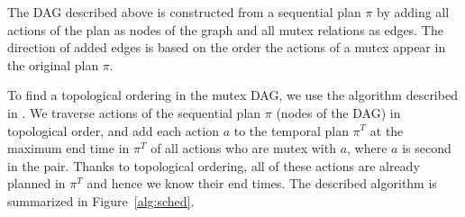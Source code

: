 The DAG described above is constructed
from a sequential plan $\pi$ by adding
all actions of the plan as nodes of the graph
and all mutex relations as edges.
The direction of added edges is based on the order
the actions of a mutex appear in the original plan $\pi$.

To find a topological ordering in the mutex DAG,
we use the algorithm described in \citet{Kahn1962}.
We traverse actions of the sequential plan $\pi$
(nodes of the DAG)
in topological order, and add each action $a$
to the temporal plan $\pi^T$
at the maximum end time in $\pi^T$ of all actions
who are mutex with $a$, where $a$ is second in the pair.
Thanks to topological ordering, all of these actions
are already planned in $\pi^T$ and hence we know their end times.
The described algorithm is summarized in Figure~\ref{alg:sched}.

